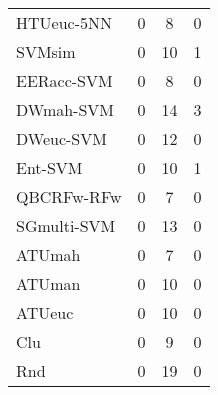 \begin{table}[h]
\begin{center}
{\begin{tabular}{lccc}
HTUeuc-5NN & 0 & 8 & 0 \\
SVMsim     & 0 & 10 & 1 \\
EERacc-SVM & 0 & 8 & 0 \\
DWmah-SVM  & 0 & 14 & 3 \\
DWeuc-SVM  & 0 & 12 & 0 \\
Ent-SVM    & 0 & 10 & 1 \\
QBCRFw-RFw & 0 & 7 & 0 \\
SGmulti-SVM & 0 & 13 & 0 \\
ATUmah     & 0 & 7 & 0 \\
ATUman     & 0 & 10 & 0 \\
ATUeuc     & 0 & 10 & 0 \\
Clu        & 0 & 9 & 0 \\
Rnd        & 0 & 19 & 0 \\
\end{tabular}

         }
\label{contaFriedPares}
\end{center}
\end{table}